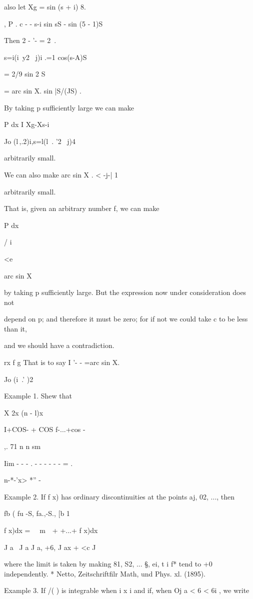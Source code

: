 also let Xg = sin (s + i) 8.

, P . c - - s-i sin sS - sin (5 - 1)S

Then 2 - '- = 2 \,.

s=i(i\ y2 \ j)i .=1 cos(s-A)S

= 2/9 sin 2 S

= arc sin X. sin |S/(JS) .

By taking p sufficiently large we can make

P dx I Xg-Xs-i

Jo (l\,,.2)i,s=l(l\ . '2 \ j)4

arbitrarily small.

We can also make arc sin X . < -j-| 1

arbitrarily small.

That is, given an arbitrary number f, we can make

P dx

/ i~

<e

arc sin X

by taking p sufficiently large. But the expression now under
consideration does not

depend on p; and therefore it must be zero; for if not we could take
c to be less than it,

and we should have a contradiction.

rx f g That is to say I '- - =arc sin X.

Jo (i\ .' )2

Example 1. Shew that

X 2x (n - l)x

I+COS- + COS f-...+cos -

,. 71 n n sm

Iim - - - . - - - - - - = .

n-*-'x> *'' -

Example 2. If f x) has ordinary discontinuities at the points aj, 02,
..., then

fb ( fu -S, fa.,-S., [b 1

f x)dx = \ \ m\ \ + +...+ f x)dx\,

J a \ J a J a, +6, J ax + <c J

where the limit is taken by making 81, S2, ... §, ei, t i  f* tend
to +0 independently. * Netto, Zeitschriftfilr Math, und Phys. xl.
(1895).

%
%

Example 3. If /( ) is integrable when i x i and if, when Oj a < 6 < 6i
, we write

